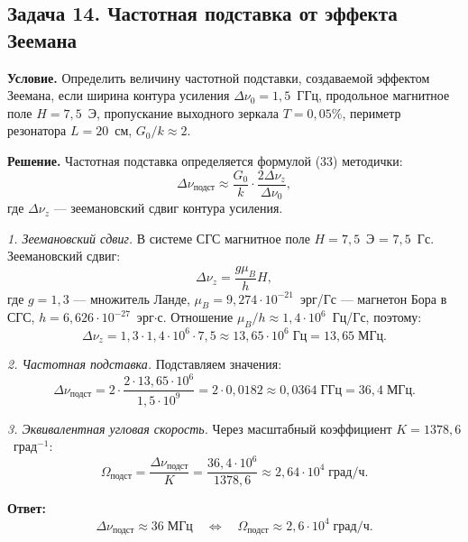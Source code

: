\documentclass[12pt, a4paper]{article}
\begin{document}
\subsection*{Задача 14. Частотная подставка от эффекта Зеемана}

\textbf{Условие.} Определить величину частотной подставки, создаваемой эффектом Зеемана, если ширина контура усиления $\Delta\nu_0 = 1{,}5$~ГГц, продольное магнитное поле $H = 7{,}5$~Э, пропускание выходного зеркала $T = 0{,}05\%$, периметр резонатора $L = 20$~см, $G_0/k \approx 2$.

\textbf{Решение.} Частотная подставка определяется формулой (33) методички:
\begin{equation}
    \Delta \nu_{\text{подст}} \approx \frac{G_0}{k} \cdot \frac{2 \Delta \nu_z}{\Delta \nu_0},
\end{equation}
где $\Delta \nu_z$ --- зеемановский сдвиг контура усиления.

\textit{1. Зеемановский сдвиг.} В системе СГС магнитное поле $H = 7{,}5$~Э = $7{,}5$~Гс. Зеемановский сдвиг:
\begin{equation}
    \Delta \nu_z = \frac{g \mu_B}{h} H,
\end{equation}
где $g = 1{,}3$ --- множитель Ланде, $\mu_B = 9{,}274 \cdot 10^{-21}$~эрг/Гс --- магнетон Бора в СГС, $h = 6{,}626 \cdot 10^{-27}$~эрг$\cdot$с. Отношение $\mu_B/h \approx 1{,}4 \cdot 10^6$~Гц/Гс, поэтому:
\begin{equation}
    \Delta \nu_z = 1{,}3 \cdot 1{,}4 \cdot 10^6 \cdot 7{,}5 \approx 13{,}65 \cdot 10^6 \; \text{Гц} = 13{,}65 \; \text{МГц}.
\end{equation}

\textit{2. Частотная подставка.} Подставляем значения:
\begin{equation}
    \Delta \nu_{\text{подст}} = 2 \cdot \frac{2 \cdot 13{,}65 \cdot 10^6}{1{,}5 \cdot 10^9} = 2 \cdot 0{,}0182 \approx 0{,}0364 \; \text{ГГц} = 36{,}4 \; \text{МГц}.
\end{equation}

\textit{3. Эквивалентная угловая скорость.} Через масштабный коэффициент $K = 1378{,}6$~град$^{-1}$:
\begin{equation}
    \Omega_{\text{подст}} = \frac{\Delta \nu_{\text{подст}}}{K} = \frac{36{,}4 \cdot 10^6}{1378{,}6} \approx 2{,}64 \cdot 10^4 \; \text{град/ч}.
\end{equation}

\textbf{Ответ:}
\[
    \boxed{\Delta \nu_{\text{подст}} \approx 36 \; \text{МГц} \quad \Leftrightarrow \quad \Omega_{\text{подст}} \approx 2{,}6 \cdot 10^4 \; \text{град/ч}.}
\]
\end{document}

